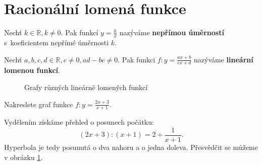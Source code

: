 \section{Racionální lomená funkce}
\begin{definition}
    Nechť $k \in \mathbb R, k \ne 0.$ Pak funkcí $y=\frac{k}{x}$
    nazýváme \textbf{nepřímou úměrností} s~koeficientem nepřímé úměrnosti $k$.
\end{definition}

\begin{definition}
    Nechť $a,b,c,d \in \mathbb R, c \ne 0, ad-bc \ne 0.$ Pak funkci
    $f:y=\frac{ax+b}{cx+d}$ nazýváme \textbf{lineární lomenou
    funkcí}.
\end{definition}

\begin{figure}[ht!]
  \centering
\label{reseniobr}
  \caption{Grafy různých lineárně lomených funkcí}
\end{figure}

\begin{priklad}
Nakreslete graf funkce $f: y=\frac{2x+3}{x+1}.$
\end{priklad}

\begin{reseni}
Vydělením získáme přehled o posunech počátku:
\begin{equation*}
	(2x+3):(x+1)=2+\frac{1}{x+1}.
\end{equation*}
Hyperbola je tedy posunutá o dva nahoru a o jedna doleva. Přesvědčit se můžeme v obrázku \ref{reseniobr}.
\end{reseni}

